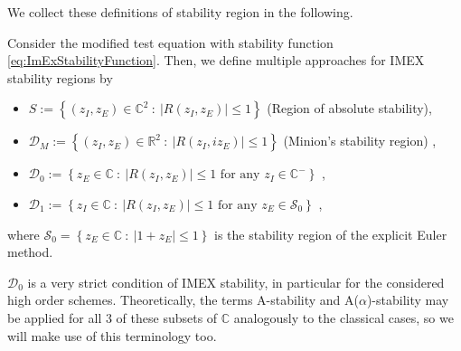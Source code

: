 We collect these definitions of stability region in the following.
\begin{definition}
	Consider the modified test equation with stability function \eqref{eq:ImExStabilityFunction}. Then, we define multiple approaches for IMEX stability regions by
	\begin{itemize}
		\item $S:=\left\{(z_I,z_E)\in \mathbb{C}^2 \ :\ \lvert{R(z_I,z_E)}\rvert\le1\right\}$ (Region of absolute stability),
	\item  $\mathcal{D}_M:= \left\{(z_I,z_E)\in \mathbb{R}^2 \ :\ \lvert{R(z_I,iz_E)}\rvert\le1\right\}$  (Minion's stability region) \cite{minion2003dec}, 
	\item  $\mathcal{D}_0:=\left\{z_E \in \mathbb{C}\ :\ \lvert{R(z_I,z_E)}\rvert \le 1 \textrm{ for any } z_I \in \mathbb{C}^- \right\}$ \cite{liotta2000central},
	\item $\mathcal{D}_1:=\left\{z_I \in \mathbb{C}\ :\ \lvert{R(z_I,z_E)}\rvert \le 1 \textrm{ for any } z_E \in \mathcal{S}_0 \right\}$ \cite{Hundsdorfer},
	\end{itemize}
	where $\mathcal{S}_0=\left\{z_E \in \mathbb{C}\ :\ \lvert 1+z_E\rvert \le 1 \right\}$ is the stability region of the explicit Euler method. 
\end{definition}
$\mathcal D_0$ is a very strict condition of IMEX stability, in particular for the considered high order schemes. 
Theoretically, the terms A-stability and A($\alpha$)-stability may be applied for all 3 of these subsets of $\mathbb{C}$ analogously to the classical cases, so we will make use of this terminology too. 


